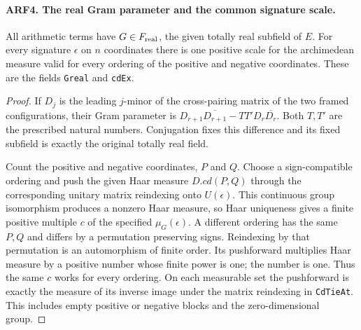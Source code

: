 \paragraph{ARF4. The real Gram parameter and the common signature scale.}
All arithmetic terms have $G\in F_{\rm real}$, the given totally
real subfield of $E$. For every signature $\epsilon$ on $n$
coordinates there is one positive scale for the archimedean
measure valid for every ordering of the positive and negative
coordinates. These are the fields \texttt{Greal} and \texttt{cdEx}.
\begin{proof}
If $D_j$ is the leading $j$-minor of the cross-pairing matrix of
the two framed configurations, their Gram parameter is
$D_{r+1}\overline{D_{r+1}}-TT'D_r\overline{D_r}$. Both $T,T'$
are the prescribed natural numbers. Conjugation fixes this difference
and its fixed subfield is exactly the original totally real field.

Count the positive and negative coordinates, $P$ and $Q$. Choose
a sign-compatible ordering and push the given Haar measure
$D.cd(P,Q)$ through the corresponding unitary matrix reindexing
onto $U(\epsilon)$. This continuous group isomorphism produces
a nonzero Haar measure, so Haar uniqueness gives a finite positive
multiple $c$ of the specified $\mu_G(\epsilon)$. A different
ordering has the same $P,Q$ and differs by a permutation
preserving signs. Reindexing by that permutation is an automorphism
of finite order. Its pushforward multiplies Haar measure by a
positive number whose finite power is one; the number is one.
Thus the same $c$ works for every ordering. On each measurable
set the pushforward is exactly the measure of its inverse image
under the matrix reindexing in \texttt{CdTieAt}. This includes
empty positive or negative blocks and the zero-dimensional group.
\end{proof}
